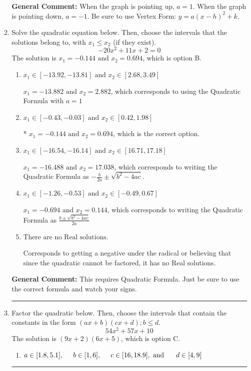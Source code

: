 \documentclass{extbook}[14pt]
\newcommand{\litem}[1]{\item #1

\rule{\textwidth}{0.4pt}}
\begin{document}
\begin{enumerate}
{\textbf{General Comment:} When the graph is pointing up, $a=1$. When the graph is pointing down, $a=-1$. Be sure to use Vertex Form: $y = a(x-h)^2+k$.
}
\litem{
Solve the quadratic equation below. Then, choose the intervals that the solutions belong to, with $x_1 \leq x_2$ (if they exist).
\[ -20x^{2} +11 x + 2 = 0 \]The solution is \( x_1 = -0.144 \text{ and } x_2 = 0.694 \), which is option B.\begin{enumerate}[label=\Alph*.]
\item \( x_1 \in [-13.92, -13.81] \text{ and } x_2 \in [2.68, 3.49] \)

 $x_1 = -13.882 \text{ and } x_2 = 2.882$, which corresponds to using the Quadratic Formula with $a=1$
\item \( x_1 \in [-0.43, -0.03] \text{ and } x_2 \in [0.42, 1.98] \)

* $x_1 = -0.144 \text{ and } x_2 = 0.694$, which is the correct option.
\item \( x_1 \in [-16.54, -16.14] \text{ and } x_2 \in [16.71, 17.18] \)

 $x_1 = -16.488 \text{ and } x_2 = 17.038$, which corresponds to writing the Quadratic Formula as $-\frac{b}{2a} \pm \sqrt{b^2 - 4ac}$.
\item \( x_1 \in [-1.26, -0.53] \text{ and } x_2 \in [-0.49, 0.67] \)

 $x_1 = -0.694 \text{ and } x_2 = 0.144$, which corresponds to writing the Quadratic Formula as $\frac{b \pm \sqrt{b^2 - 4ac}}{2a}$
\item \( \text{There are no Real solutions.} \)

Corresponds to getting a negative under the radical or believing that since the quadratic cannot be factored, it has no Real solutions.
\end{enumerate}

\textbf{General Comment:} This requires Quadratic Formula. Just be sure to use the correct formula and watch your signs.
}
\litem{
Factor the quadratic below. Then, choose the intervals that contain the constants in the form $(ax+b)(cx+d); b \leq d.$
\[ 54x^{2} +57 x + 10 \]The solution is \( (9x + 2)(6x + 5) \), which is option C.\begin{enumerate}[label=\Alph*.]
\item \( a \in [1.8, 5.1], \hspace*{5mm} b \in [1, 6], \hspace*{5mm} c \in [16, 18.9], \text{ and } \hspace*{5mm} d \in [4, 9] \)


\end{enumerate}}
\end{enumerate}
\end{document}
